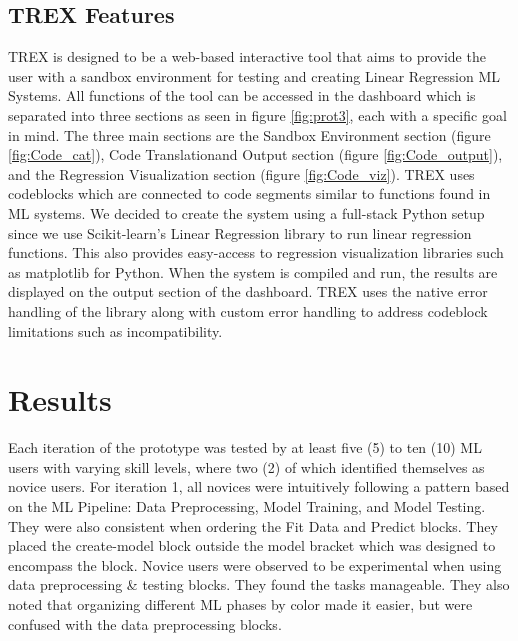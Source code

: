 \documentclass{sigchi-ext}
\begin{document}
\subsection{TREX Features}
TREX is designed to be a web-based interactive tool that aims to provide the user with a sandbox environment for testing and creating Linear Regression ML Systems. All functions of the tool can be accessed in the dashboard which is separated into three sections as seen in figure \ref{fig:prot3}, each with a specific goal in mind. The three main sections are the Sandbox Environment section (figure \ref{fig:Code_cat}), Code Translationand Output section (figure \ref{fig:Code_output}), and the Regression Visualization section (figure \ref{fig:Code_viz}). TREX uses codeblocks which are connected to code segments similar to functions found in ML systems. We decided to create the system using a full-stack Python setup since we use Scikit-learn's Linear Regression library to run linear regression functions. This also provides easy-access to regression visualization libraries such as matplotlib for Python. When the system is compiled and run, the results are displayed on the output section of the dashboard. TREX uses the native error handling of the library along with custom error handling to address codeblock limitations such as incompatibility.

\section{Results}

Each iteration of the prototype was tested by at least five (5) to ten (10) ML users with varying skill levels, where two (2) of which identified themselves as novice users.
For iteration 1, all novices were intuitively following a pattern based on the ML Pipeline: Data Preprocessing, Model Training, and Model Testing. They were also consistent when ordering the Fit Data and Predict blocks. They placed the create-model block outside the model bracket which was designed to encompass the block. Novice users were observed to be experimental when using data preprocessing \& testing blocks. They found the tasks manageable. They also noted that organizing different ML phases by color made it easier, but were confused with the data preprocessing blocks. 
\end{document}
